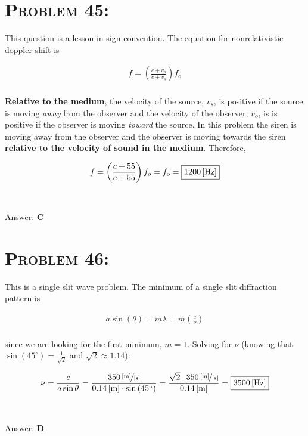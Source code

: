 \documentclass{article}
\begin{document}
\section{\textsc{Problem 45:}} This question is a lesson in sign convention. The equation for nonrelativistic doppler shift is

\begin{align}
f = \left(\frac{c \mp v_{o}}{c \pm v_{s}}\right) f_{o}
\end{align}
\\
\textbf{Relative to the medium}, the velocity of the source, $v_{s}$, is positive if the source is moving \textit{away} from the observer and the velocity of the observer, $v_{o}$, is is positive if the observer is moving \textit{toward} the source. In this problem the siren is moving away from the observer and the observer is moving towards the siren \textbf{relative to the velocity of sound in the medium}. Therefore,

\begin{align}
f = \left(\frac{c + 55}{c + 55}\right) f_{o} = f_{o} = \boxed{\unit[1200]{[Hz]}}\nonumber
\end{align}
\\\\
Answer: \textbf{\textcolor{ProcessBlue}C}\\


\section{\textsc{Problem 46:}} This is a single slit wave problem. The minimum of a single slit diffraction pattern is

\begin{align}
a \sin(\theta) = m \lambda = m \left(\frac{c}{\nu}\right)
\end{align}
\\
since we are looking for the first minimum, $m = 1$. Solving for $\nu$ (knowing that $\sin{(45^{\circ})} = \frac{1}{\sqrt{2}}$ and $\sqrt{2} \approx 1.14$):

\begin{align}
\nu = \frac{c}{a \sin{\theta} } = \frac{\unitfrac[350]{[m]}{[s]}}{\unit[0.14]{[m]} \cdot \sin{(45^{\circ})}} = \frac{\sqrt{2} \cdot \unitfrac[350]{[m]}{[s]}}{\unit[0.14]{[m]} } =\boxed{ \unit[3500]{[Hz]}}\nonumber
\end{align}
\\\\
Answer: \textbf{\textcolor{ProcessBlue}D}\\
\end{document}
